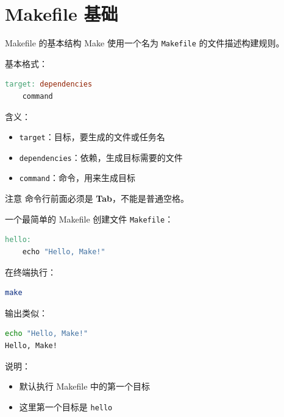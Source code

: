 \documentclass[aspectratio=169]{ctexbeamer}
\begin{document}
\section{Makefile 基础}

\begin{frame}[fragile]{Makefile 的基本结构}
Make 使用一个名为 \texttt{Makefile} 的文件描述构建规则。

基本格式：

\begin{lstlisting}[language=make]
target: dependencies
	command
\end{lstlisting}

含义：

\begin{itemize}
  \item \texttt{target}：目标，要生成的文件或任务名
  \item \texttt{dependencies}：依赖，生成目标需要的文件
  \item \texttt{command}：命令，用来生成目标
\end{itemize}

\begin{alertblock}{注意}
命令行前面必须是 \textbf{Tab}，不能是普通空格。
\end{alertblock}
\end{frame}

\begin{frame}[fragile]{一个最简单的 Makefile}
创建文件 \texttt{Makefile}：

\begin{lstlisting}[language=make]
hello:
	echo "Hello, Make!"
\end{lstlisting}

在终端执行：

\begin{lstlisting}[language=bash]
make
\end{lstlisting}

输出类似：

\begin{lstlisting}[language=bash]
echo "Hello, Make!"
Hello, Make!
\end{lstlisting}

说明：

\begin{itemize}
  \item 默认执行 Makefile 中的第一个目标
  \item 这里第一个目标是 \texttt{hello}
\end{itemize}
\end{frame}
\end{document}

